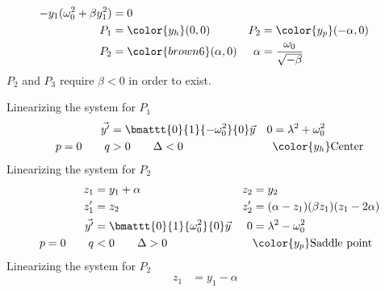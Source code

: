 \begin{enumerate}
\begin{enumerate}
\begin{align}
                        -y_1(\omega_0^{2} + \beta y_1^{2}) & = 0                                \\
                        P_1                                & = \color{y_h}(0, 0)              &
                        P_2                                & = \color{y_p}
                        (-\alpha, 0)                                                            \\
                        P_2                                & = \color{brown6}
                        (\alpha, 0)                        &
                        \alpha                             & = \frac{\omega_0}{\sqrt{-\beta}}
                    \end{align}
                    $ P_2 $ and $ P_3 $ require $ \beta < 0 $ in order to exist. \par
                    Linearizing the system for $ P_1 $
                    \begin{align}
                        \vec{y'}       & = \bmattt{0}{1}{-\omega_0^{2}}{0} \vec{y} &
                        0              & = \lambda^{2} + \omega_0^{2}                \\
                        p = 0 \qquad q & > 0 \qquad \Delta < 0                     &
                                       & \color{y_h} \text{Center}
                    \end{align}
                    Linearizing the system for $ P_2 $
                    \begin{align}
                        z_1            & = y_1 + \alpha                             &
                        z_2            & = y_2                                        \\
                        z_1'           & = z_2                                      &
                        z_2'           & = (\alpha - z_1)(\beta z_1)(z_1 - 2\alpha)   \\
                        \vec{y'}       & = \bmattt{0}{1}{\omega_0^{2}}{0} \vec{y}   &
                        0              & = \lambda^{2} - \omega_0^{2}                 \\
                        p = 0 \qquad q & < 0 \qquad \Delta > 0                      &
                                       & \color{y_p} \text{Saddle point}
                    \end{align}
                    Linearizing the system for $ P_2 $
                    \begin{align}
                        z_1            & = y_1 - \alpha                              &

\end{align}
\end{enumerate}
\end{enumerate}

